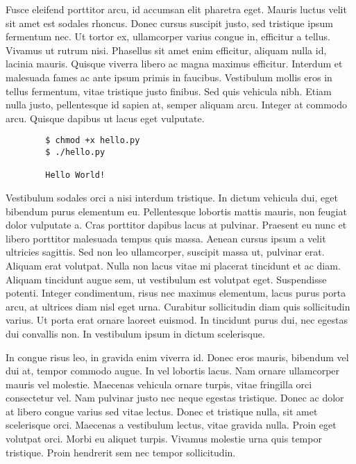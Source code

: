 \documentclass{article}
\begin{document}
Fusce eleifend porttitor arcu, id accumsan elit pharetra eget. Mauris luctus velit sit amet est sodales rhoncus. Donec cursus suscipit justo, sed tristique ipsum fermentum nec. Ut tortor ex, ullamcorper varius congue in, efficitur a tellus. Vivamus ut rutrum nisi. Phasellus sit amet enim efficitur, aliquam nulla id, lacinia mauris. Quisque viverra libero ac magna maximus efficitur. Interdum et malesuada fames ac ante ipsum primis in faucibus. Vestibulum mollis eros in tellus fermentum, vitae tristique justo finibus. Sed quis vehicula nibh. Etiam nulla justo, pellentesque id sapien at, semper aliquam arcu. Integer at commodo arcu. Quisque dapibus ut lacus eget vulputate.

\begin{commandline}
	\begin{verbatim}
		$ chmod +x hello.py
		$ ./hello.py

		Hello World!
	\end{verbatim}
\end{commandline}

Vestibulum sodales orci a nisi interdum tristique. In dictum vehicula dui, eget bibendum purus elementum eu. Pellentesque lobortis mattis mauris, non feugiat dolor vulputate a. Cras porttitor dapibus lacus at pulvinar. Praesent eu nunc et libero porttitor malesuada tempus quis massa. Aenean cursus ipsum a velit ultricies sagittis. Sed non leo ullamcorper, suscipit massa ut, pulvinar erat. Aliquam erat volutpat. Nulla non lacus vitae mi placerat tincidunt et ac diam. Aliquam tincidunt augue sem, ut vestibulum est volutpat eget. Suspendisse potenti. Integer condimentum, risus nec maximus elementum, lacus purus porta arcu, at ultrices diam nisl eget urna. Curabitur sollicitudin diam quis sollicitudin varius. Ut porta erat ornare laoreet euismod. In tincidunt purus dui, nec egestas dui convallis non. In vestibulum ipsum in dictum scelerisque.

\begin{warn}[Notice:]
  In congue risus leo, in gravida enim viverra id. Donec eros mauris, bibendum vel dui at, tempor commodo augue. In vel lobortis lacus. Nam ornare ullamcorper mauris vel molestie. Maecenas vehicula ornare turpis, vitae fringilla orci consectetur vel. Nam pulvinar justo nec neque egestas tristique. Donec ac dolor at libero congue varius sed vitae lectus. Donec et tristique nulla, sit amet scelerisque orci. Maecenas a vestibulum lectus, vitae gravida nulla. Proin eget volutpat orci. Morbi eu aliquet turpis. Vivamus molestie urna quis tempor tristique. Proin hendrerit sem nec tempor sollicitudin.
\end{warn}

\end{document}
